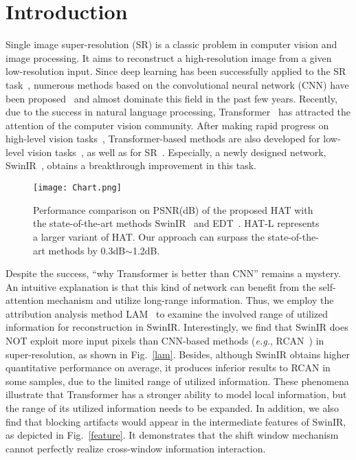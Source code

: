\documentclass[10pt,twocolumn,letterpaper]{article}
\begin{document}
\vspace{-10pt}
\section{Introduction}
Single image super-resolution (SR) is a classic problem in computer vision and image processing. It aims to reconstruct a high-resolution image from a given low-resolution input. Since deep learning has been successfully applied to the SR task~\cite{srcnn_eccv}, numerous methods based on the convolutional neural network (CNN) have been proposed~\cite{srcnn_tpami,fsrcnn,edsr,rcan,rdn,san,classsr,bsrn} and almost dominate this field in the past few years. 
Recently, due to the success in natural language processing, Transformer~\cite{transformer} has attracted the attention of the computer vision community. After making rapid progress on high-level vision tasks~\cite{vit,swin_t,pvt}, Transformer-based methods are also developed for low-level vision tasks~\cite{ipt,uformer,restormer}, as well as for SR~\cite{edt,swinir}. Especially, a newly designed network, SwinIR~\cite{swinir}, obtains a breakthrough improvement in this task. 

\begin{figure}[!t]
\vspace{-0.1cm}
\centering
\texttt{[image: Chart.png]}
\vspace{-0.6cm}
\caption{Performance comparison on PSNR(dB) of the proposed HAT with the state-of-the-art methods SwinIR~\cite{swinir} and EDT~\cite{edt}. HAT-L represents a larger variant of HAT. Our approach can surpass the state-of-the-art methods by 0.3dB$\sim$1.2dB.}
\vspace{-0.6cm}
\label{performance}
\end{figure}

Despite the success, ``why Transformer is better than CNN'' remains a mystery. An intuitive explanation is that this kind of network can benefit from the self-attention mechanism and utilize long-range information. 
Thus, we employ the attribution analysis method LAM~\cite{lam} to examine the involved range of utilized information for reconstruction in SwinIR. Interestingly, we find that SwinIR does NOT exploit more input pixels than CNN-based methods (\textit{e.g.}, RCAN~\cite{rcan}) in super-resolution, as shown in Fig.~\ref{lam}.
Besides, although SwinIR obtains higher quantitative performance on average, it produces inferior results to RCAN in some samples, due to the limited range of utilized information. 
These phenomena illustrate that Transformer has a stronger ability to model local information, but the range of its utilized information needs to be expanded.
In addition, we also find that blocking artifacts would appear in the intermediate features of SwinIR, as depicted in Fig.~\ref{feature}. It demonstrates that the shift window mechanism cannot perfectly realize cross-window information interaction. 
\end{document}
